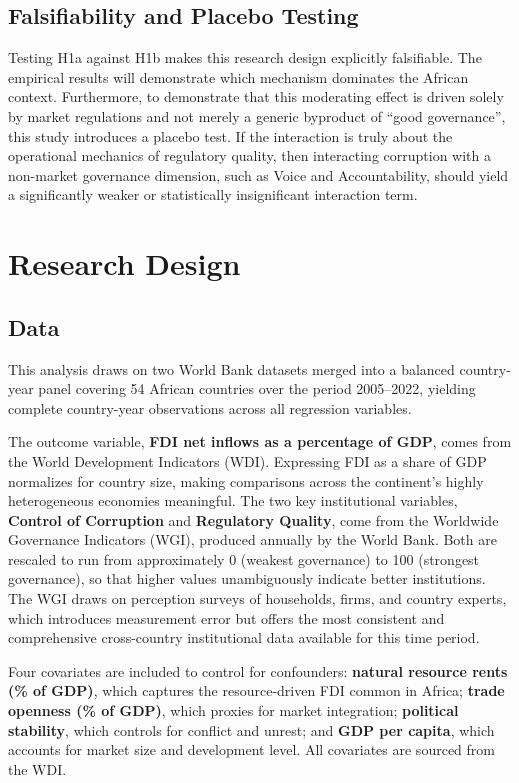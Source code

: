 \documentclass[
  12pt,
  letterpaper,
  DIV=11,
  numbers=noendperiod]{scrartcl}
\begin{document}
\subsection{Falsifiability and Placebo
Testing}\label{falsifiability-and-placebo-testing}

Testing H1a against H1b makes this research design explicitly
falsifiable. The empirical results will demonstrate which mechanism
dominates the African context. Furthermore, to demonstrate that this
moderating effect is driven solely by market regulations and not merely
a generic byproduct of ``good governance'', this study introduces a
placebo test. If the interaction is truly about the operational
mechanics of regulatory quality, then interacting corruption with a
non-market governance dimension, such as Voice and Accountability,
should yield a significantly weaker or statistically insignificant
interaction term.

\section{Research Design}\label{research-design}

\subsection{Data}\label{data}

This analysis draws on two World Bank datasets merged into a balanced
country-year panel covering 54 African countries over the period
2005--2022, yielding complete country-year observations across all
regression variables.

The outcome variable, \textbf{FDI net inflows as a percentage of GDP},
comes from the World Development Indicators (WDI). Expressing FDI as a
share of GDP normalizes for country size, making comparisons across the
continent's highly heterogeneous economies meaningful. The two key
institutional variables, \textbf{Control of Corruption} and
\textbf{Regulatory Quality}, come from the Worldwide Governance
Indicators (WGI), produced annually by the World Bank. Both are rescaled
to run from approximately 0 (weakest governance) to 100 (strongest
governance), so that higher values unambiguously indicate better
institutions. The WGI draws on perception surveys of households, firms,
and country experts, which introduces measurement error but offers the
most consistent and comprehensive cross-country institutional data
available for this time period.

Four covariates are included to control for confounders: \textbf{natural
resource rents (\% of GDP)}, which captures the resource-driven FDI
common in Africa; \textbf{trade openness (\% of GDP)}, which proxies for
market integration; \textbf{political stability}, which controls for
conflict and unrest; and \textbf{GDP per capita}, which accounts for
market size and development level. All covariates are sourced from the
WDI.
\end{document}
